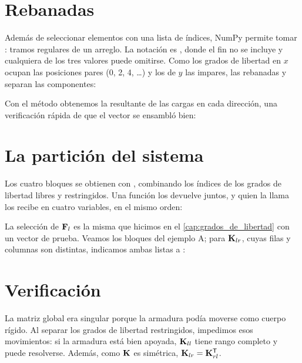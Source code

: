 \section{Rebanadas}\label{sec:rebanadas}

Además de seleccionar elementos con una lista de índices, NumPy permite
tomar : tramos regulares de un arreglo. La
notación es , donde el fin no se incluye y cualquiera
de los tres valores puede omitirse. Como los grados de libertad en $x$
ocupan las posiciones pares (0, 2, 4, \dots) y los de $y$ las impares, las
rebanadas \py{[0::2]} y \py{[1::2]} separan las componentes:

Con el método  obtenemos la resultante de las cargas en cada
dirección, una verificación rápida de que el vector se ensambló bien:

\section{La partición del sistema}\label{sec:particion}

Los cuatro bloques se obtienen con , combinando los índices de los
grados de libertad libres y restringidos. Una función los devuelve juntos, y
quien la llama los recibe en cuatro variables, en el mismo orden:

La selección de $\mathbf{F}_l$ es la misma que hicimos en el
\cref{cap:grados_de_libertad} con un vector de prueba. Veamos los bloques del
ejemplo A; para $\mathbf{K}_{lr}$, cuyas filas y columnas son distintas, indicamos
ambas listas a :

\section{Verificación}\label{sec:verificacion_particion}

La matriz global era singular porque la armadura podía moverse como cuerpo
rígido. Al separar los grados de libertad restringidos, impedimos esos
movimientos: si la armadura está bien apoyada, $\mathbf{K}_{ll}$ tiene rango
completo y puede resolverse. Además, como $\mathbf{K}$ es simétrica,
$\mathbf{K}_{lr} = \mathbf{K}_{rl}^\mathsf{T}$.

